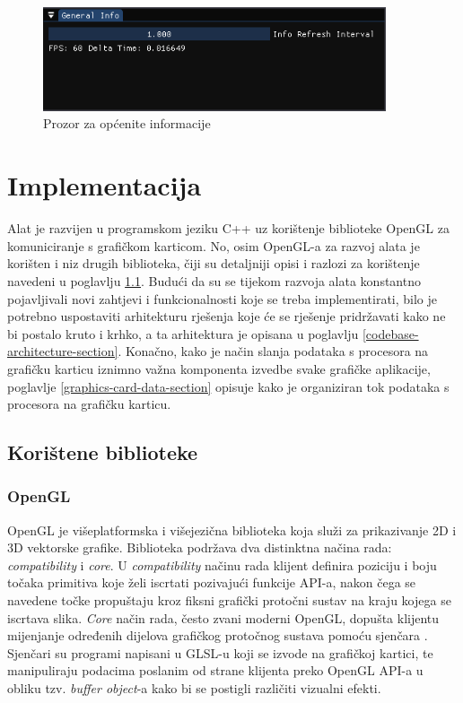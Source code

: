 \documentclass[times, utf8, diplomski]{fer}
\begin{document}
\begin{figure} [H]
	\centering
    \includegraphics[width=0.9\textwidth]{general_info.png}
    \caption{Prozor za općenite informacije\\}
    \label{fig:general-info}
\end{figure}

\chapter{Implementacija}

Alat je razvijen u programskom jeziku C++ uz korištenje biblioteke OpenGL za komuniciranje s grafičkom karticom. No, osim OpenGL-a za razvoj alata je korišten i niz drugih biblioteka, čiji su detaljniji opisi i razlozi za korištenje navedeni u poglavlju \ref{libraries-section}. Budući da su se tijekom razvoja alata konstantno pojavljivali novi zahtjevi i funkcionalnosti koje se treba implementirati, bilo je potrebno uspostaviti arhitekturu rješenja koje će se rješenje pridržavati kako ne bi postalo kruto i krhko, a ta arhitektura je opisana u poglavlju \ref{codebase-architecture-section}. Konačno, kako je način slanja podataka s procesora na grafičku karticu iznimno važna komponenta izvedbe svake grafičke aplikacije, poglavlje \ref{graphics-card-data-section} opisuje kako je organiziran tok podataka s procesora na grafičku karticu.

\section{Korištene biblioteke} \label{libraries-section}

\subsection{OpenGL}

OpenGL \citep{opengl} je višeplatformska i višejezična biblioteka koja služi za prikazivanje 2D i 3D vektorske grafike. Biblioteka podržava dva distinktna načina rada: \textit{compatibility} i \textit{core}. U \textit{compatibility} načinu rada klijent definira poziciju i boju točaka primitiva koje želi iscrtati pozivajući funkcije API-a, nakon čega se navedene točke propuštaju kroz fiksni grafički protočni sustav na kraju kojega se iscrtava slika. \textit{Core} način rada, često zvani moderni OpenGL, dopušta klijentu mijenjanje određenih dijelova grafičkog protočnog sustava pomoću sjenčara . Sjenčari su programi napisani u GLSL-u  koji se izvode na grafičkoj kartici, te manipuliraju podacima poslanim od strane klijenta preko OpenGL API-a u obliku tzv. \textit{buffer object}-a kako bi se postigli različiti vizualni efekti.\\
\end{document}
